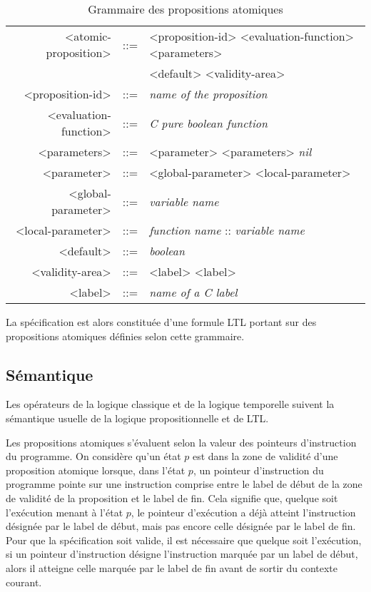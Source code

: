 \begin{table}[h]
\centering
\caption{Grammaire des propositions atomiques}
\label{tab:spe_gram}
\begin{tabular}[]{@{}rcl@{}}
\hline
<atomic-proposition>  & ::= & <proposition-id> <evaluation-function> <parameters>\\
                      &     &  <default> <validity-area>\\
<proposition-id>      & ::= & \emph{name of the proposition}\\
<evaluation-function> & ::= & \emph{C pure boolean function}\\
<parameters>          & ::= & <parameter> <parameters> \textbar{} \emph{nil}\\
<parameter>           & ::= & <global-parameter> \textbar{} <local-parameter>\\
<global-parameter>    & ::= & \emph{variable name}\\
<local-parameter>     & ::= & \emph{function name} :: \emph{variable name}\\
<default>             & ::= & \emph{boolean}\\
<validity-area>       & ::= & <label> <label>\\
<label>               & ::= & \emph{name of a C label}\\
\hline
\end{tabular}
\end{table}

La spécification est alors constituée d'une formule LTL portant sur des
propositions atomiques définies selon cette grammaire.

\subsection{Sémantique}

Les opérateurs de la logique classique et de la logique temporelle
suivent la sémantique usuelle de la logique propositionnelle et de LTL.

Les propositions atomiques s'évaluent selon la valeur des pointeurs
d'instruction du programme. On considère qu'un état \(p\) est dans la zone de
validité d'une proposition atomique lorsque, dans l'état \(p\), un pointeur
d'instruction du programme pointe sur une instruction comprise entre le label de
début de la zone de validité de la proposition et le label de fin. Cela signifie
que, quelque soit l'exécution menant à l'état \(p\), le pointeur d'exécution a
déjà atteint l'instruction désignée par le label de début, mais pas encore celle
désignée par le label de fin. Pour que la spécification soit valide, il est
nécessaire que quelque soit l'exécution, si un pointeur d'instruction désigne
l'instruction marquée par un label de début, alors il atteigne celle marquée par
le label de fin avant de sortir du contexte courant.

